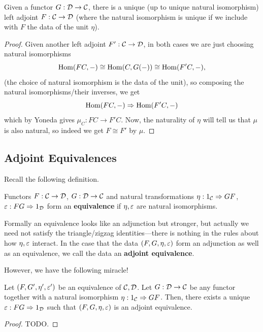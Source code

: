\documentclass[12pt]{article}
\begin{document}
\begin{cor}
    Given a functor $G:\mathcal{D}\to \mathcal{C}$, there is a unique (up to unique natural isomorphism) left adjoint $F:\mathcal{C}\to \mathcal{D}$ (where the natural isomorphism is unique if we include with $F$ the data of the unit $\eta$).
\end{cor}
\begin{proof}
    Given another left adjoint $F':\mathcal{C}\to \mathcal{D}$, in both cases we are just choosing natural isomorphisms
    \[\mathrm{Hom}(FC,-) \cong \mathrm{Hom}(C,G(-)) \cong \mathrm{Hom}(F'C,-),\]
    (the choice of natural isomorphism is the data of the unit), so composing the natural isomorphisms/their inverses, we get
    \[\mathrm{Hom}(FC,-) \Rightarrow \mathrm{Hom}(F'C,-)\]
    which by Yoneda gives $\mu_C: FC\to F'C$. Now, the naturality of $\eta$ will tell us that $\mu$ is also natural, so indeed we get $F\cong F'$ by $\mu$.
\end{proof}

\subsection{Adjoint Equivalences}

Recall the following definition.
\begin{defn}
    Functors $F:\mathcal{C}\to\mathcal{D}$, $G:\mathcal{D}\to\mathcal{C}$ and natural transformations $\eta:1_{\mathcal{C}} \Rightarrow GF$, $\varepsilon: FG \Rightarrow 1_{\mathcal{D}}$ form an \textbf{equivalence} if $\eta,\varepsilon$ are natural isomorphisms.
\end{defn}

Formally an equivalence looks like an adjunction but stronger, but actually we need not satisfy the triangle/zigzag identities---there is nothing in the rules about how $\eta,\varepsilon$ interact. In the case that the data $(F,G,\eta,\varepsilon)$ form an adjunction as well as an equivalence, we call the data an \textbf{adjoint equivalence}.

However, we have the following miracle!

\begin{prop}
    Let $(F,G',\eta',\varepsilon')$ be an equivalence of $\mathcal{C}, \mathcal{D}$. Let $G: \mathcal{D}\to \mathcal{C}$ be any functor together with a natural isomorphism $\eta: 1_{\mathcal{C}} \Rightarrow GF$. Then, there exists a unique $\varepsilon: FG \Rightarrow 1_{\mathcal{D}}$ such that $(F,G,\eta,\varepsilon)$ is an adjoint equivalence. 
\end{prop}

\begin{proof}
    {\color{red} TODO.}
\end{proof}
\end{document}
